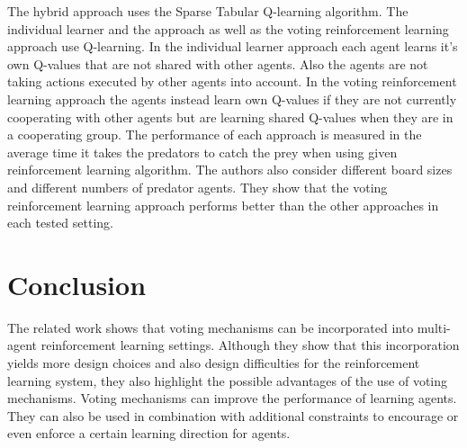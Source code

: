 \documentclass[conference]{IEEEtran}
\begin{document}
The hybrid approach uses the Sparse Tabular Q-learning algorithm.
The individual learner and the approach as well as the voting reinforcement learning approach use Q-learning.
In the individual learner approach each agent learns it's own Q-values that are not shared with other agents. Also the agents are not taking actions executed by other agents into account.
In the voting reinforcement learning approach the agents instead learn own Q-values if they are not currently cooperating with other agents but are learning shared Q-values when they are in a cooperating group.
The performance of each approach is measured in the average time it takes the predators to catch the prey when using given reinforcement learning algorithm.
The authors also consider different board sizes and different numbers of predator agents. They show that the voting reinforcement learning approach performs better than the other approaches in each tested setting.

\section{Conclusion}\label{4Conclusion}
The related work shows that voting mechanisms can be incorporated into multi-agent reinforcement learning settings. Although they show that this incorporation yields more design choices and also design difficulties for the reinforcement learning system, they also highlight the possible advantages of the use of voting mechanisms. Voting mechanisms can improve the performance of learning agents. They can also be used in combination with additional constraints to encourage or even enforce a certain learning direction for agents.




\vspace{12pt}
\end{document}
